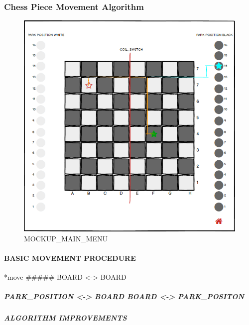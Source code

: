 \hypertarget{chess-piece-movement-algorithm}{%
\subsubsection{Chess Piece Movement
Algorithm}\label{chess-piece-movement-algorithm}}

\begin{figure}
\centering
\includegraphics{./images/ATC_ChessMoveAlgorithm.png}
\caption{MOCKUP\_MAIN\_MENU}
\end{figure}

\hypertarget{basic-movement-procedure}{%
\paragraph{BASIC MOVEMENT PROCEDURE}\label{basic-movement-procedure}}

*move \#\#\#\#\# BOARD \textless{}-\textgreater{} BOARD

\hypertarget{park_position---board-board---park_positon}{%
\subparagraph{PARK\_POSITION \textless{}-\textgreater{} BOARD
\textbar{}\textbar{} BOARD \textless{}-\textgreater{}
PARK\_POSITON}\label{park_position---board-board---park_positon}}

\hypertarget{algorithm-improvements}{%
\subparagraph{ALGORITHM IMPROVEMENTS}\label{algorithm-improvements}}

